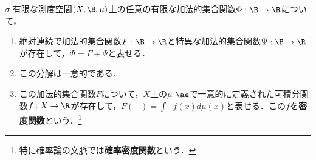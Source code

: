 \documentclass[uplatex, dvipdfmx]{jsreport}
\begin{document}
\begin{theorem}\label{thm-Radon-Nykodym}
    $\sigma$-有限な測度空間$(X,\B,\mu)$上の任意の有限な加法的集合関数$\Phi:\B\to\R$について，
    \begin{enumerate}
        \item 絶対連続で加法的集合関数$F:\B\to\R$と特異な加法的集合関数$\Psi:\B\to\R$が存在して，$\Phi=F+\Psi$と表せる．
        \item この分解は一意的である．
        \item この加法的集合関数$F$について，$X$上の$\mu$-$\ae$で一意的に定義された可積分関数$f:X\to\R$が存在して，$F(-)=\int_{-}f(x)d\mu(x)$と表せる．この$f$を\textbf{密度関数}という．\footnote{特に確率論の文脈では\textbf{確率密度関数}という．}
    \end{enumerate}
\end{theorem}
\end{document}

